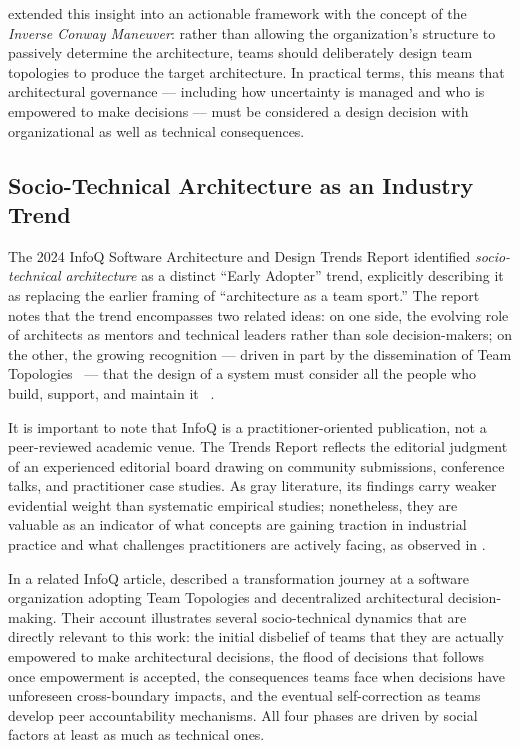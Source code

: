 \citet{skelton2019} extended this insight into an actionable framework
with the concept of the \emph{Inverse Conway Maneuver}: rather than allowing the
organization's structure to passively determine the architecture, teams should
deliberately design team topologies to produce the target architecture. In practical
terms, this means that architectural governance --- including how uncertainty is managed
and who is empowered to make decisions --- must be considered a design decision with
organizational as well as technical consequences.

\subsection{Socio-Technical Architecture as an Industry Trend}
\label{subsec:sociotechnical-trend}

The 2024 InfoQ Software Architecture and Design Trends Report \citep{infoq2024trends} identified \emph{socio-technical architecture} as a distinct ``Early Adopter'' trend,
explicitly describing it as replacing the earlier framing of ``architecture as a team
sport.'' The report notes that the trend encompasses two related ideas: on one side,
the evolving role of architects as mentors and technical leaders rather than sole
decision-makers; on the other, the growing recognition --- driven in part by the
dissemination of Team Topologies~\citep{skelton2019} --- that the design of a system
must consider all the people who build, support, and maintain it ~\citep{infoq2024trends}.

It is important to note that InfoQ is a practitioner-oriented publication, not a
peer-reviewed academic venue. The Trends Report reflects the editorial judgment of an
experienced editorial board drawing on community submissions, conference talks, and
practitioner case studies. As gray literature, its findings carry weaker evidential
weight than systematic empirical studies; nonetheless, they are valuable as an indicator
of what concepts are gaining traction in industrial practice and what challenges
practitioners are actively facing, as observed in \citet{infoq2024trends}.

In a related InfoQ article, \citet{infoq2025empowering} described
a transformation journey at a software organization adopting Team Topologies and
decentralized architectural decision-making. Their account illustrates several
socio-technical dynamics that are directly relevant to this work: the initial disbelief
of teams that they are actually empowered to make architectural decisions, the flood of
decisions that follows once empowerment is accepted, the consequences teams face when
decisions have unforeseen cross-boundary impacts, and the eventual self-correction as
teams develop peer accountability mechanisms. All four phases are driven by social
factors at least as much as technical ones.

